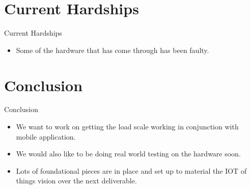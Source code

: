 \documentclass{beamer}
\begin{document}
\section{Current Hardships}
\begin{frame}{Current Hardships}
\begin{itemize}
	\item<1-> Some of the hardware that has come through has been faulty.
\end{itemize}
\end{frame}

\section{Conclusion}
\begin{frame}{Conclusion}
\begin{itemize}
	\item<1-> We want to work on getting the load scale working in conjunction with mobile application. \pause
	\item<2-> We would also like to be doing real world testing on the hardware soon. \pause
	\item<3-> Lots of foundational pieces are in place and set up to material the IOT of things vision over the next deliverable. \pause
\end{itemize}

\end{frame}
\end{document}
